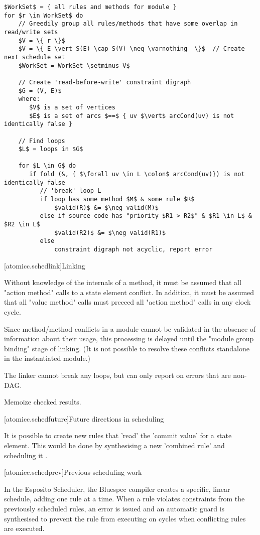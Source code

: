 \begin{lstlisting}[mathescape=true]
$WorkSet$ = { all rules and methods for module }
for $r \in WorkSet$ do
    // Greedily group all rules/methods that have some overlap in read/write sets
    $V = \{ r \}$
    $V = \{ E \vert S(E) \cap S(V) \neq \varnothing  \}$  // Create next schedule set
    $WorkSet = WorkSet \setminus V$

    // Create 'read-before-write' constraint digraph
    $G = (V, E)$
    where: 
       $V$ is a set of vertices
       $E$ is a set of arcs $==$ { uv $\vert$ arcCond(uv) is not identically false }

    // Find loops
    $L$ = loops in $G$

    for $L \in G$ do
       if fold (&, { $\forall uv \in L \colon$ arcCond(uv)}) is not identically false
          // 'break' loop L
          if loop has some method $M$ & some rule $R$
              $valid(R)$ &= $\neg valid(M)$
          else if source code has "priority $R1 > R2$" & $R1 \in L$ & $R2 \in L$
              $valid(R2)$ &= $\neg valid(R1)$
          else
              constraint digraph not acyclic, report error
\end{lstlisting}

[atomicc.schedlink]{Linking}

Without knowledge of the internals of a method, it must be assumed that all "action method"
calls to a state element conflict.  In addition, it must be assumed that all "value method" calls
must preceed all "action method" calls in any clock cycle.

Since method/method conflicts in a module cannot be validated in the absence of
information about their usage, this processing is delayed until the "module group binding"
stage of linking.
(It is not possible to resolve these conflicts standalone in the instantiated module.)

The linker cannot break any loops, but can only report on errors that are non-DAG.

Memoize checked results.

[atomicc.schedfuture]{Future directions in scheduling}

It is possible to create new rules that 'read' the 'commit value' for a state element.
This would be done by synthesising a new 'combined rule' and scheduling it \cite{Rosenband:Thesis}.

[atomicc.schedprev]{Previous scheduling work}

In the Esposito Scheduler\cite{Esposito:Patent},
the Bluespec compiler creates a specific, linear schedule, adding
one rule at a time.  When a rule violates constraints from the previously scheduled
rules, an error is issued and an automatic guard is synthesised to prevent the
rule from executing on cycles when conflicting rules are executed.

